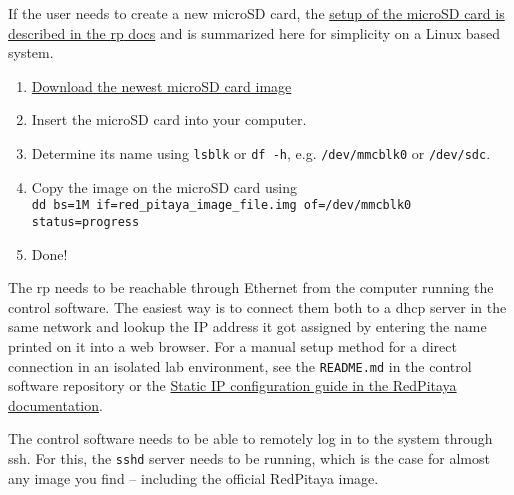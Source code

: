 If the user needs to create a new microSD card, the \href{https://redpitaya.readthedocs.io/en/latest/quickStart/SDcard/SDcard.html}{setup of the microSD card is described in the \acrshort{rp} docs} and is summarized here for simplicity on a Linux based system.

\begin{enumerate}
    \item \href{https://redpitaya.readthedocs.io/en/latest/quickStart/SDcard/SDcard.html}{Download the newest microSD card image}
    \item Insert the microSD card into your computer.
    \item Determine its name using \lstinline{lsblk} or \lstinline{df -h}, e.g. \lstinline{/dev/mmcblk0} or \lstinline{/dev/sdc}.
    \item Copy the image on the microSD card using\\ \lstinline{dd bs=1M if=red_pitaya_image_file.img of=/dev/mmcblk0 status=progress}
    \item Done!
\end{enumerate}

The \acrshort{rp} needs to be reachable through Ethernet from the computer running the control software. The easiest way is to connect them both to a \acrshort{dhcp} server in the same network and lookup the IP address it got assigned by entering the name printed on it into a web browser. For a manual setup method for a direct connection in an isolated lab environment, see the \lstinline{README.md} in the control software repository or the \href{https://redpitaya.readthedocs.io/en/latest/quickStart/connect/connect.html#static-ip-configuration}{Static IP configuration guide in the RedPitaya documentation}.

The control software needs to be able to remotely log in to the system through \acrfull{ssh}. For this, the \lstinline{sshd} server needs to be running, which is the case for almost any image you find -- including the official RedPitaya image.

